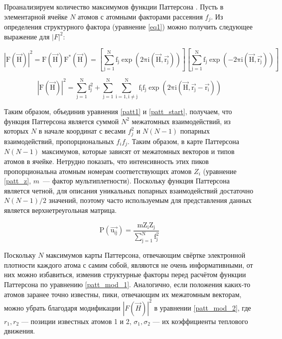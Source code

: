 Проанализируем количество максимумов функции Паттерсона \cite{rossmann_patterson_2001}. Пусть в элементарной ячейке $N$ атомов с атомными факторами рассеяния $f_j$. Из определения структурного фактора (уравнение \ref{eq1}) можно получить следующее выражение для $|F|^2$:

\begin{equation}
	\mathrm{|F(\overrightarrow{H})|^2 = F(\overrightarrow{H})F^*(\overrightarrow{H}) = \left[\sum\limits_{j=1}^N f_j \exp(2\pi i (\overrightarrow{H}, \overrightarrow{r_j}))\right]\left[\sum\limits_{j=1}^N f_j \exp(-2\pi i (\overrightarrow{H}, \overrightarrow{r_j}))\right]}
\end{equation}

\begin{equation}\label{patt1}
	\mathrm{|F(\overrightarrow{H})|^2 = \sum\limits_{j=1}^N f_j^2 + \sum\limits_{j=1}^N\sum\limits_{i=1, i\neq j}^N f_if_j\exp(2\pi i (\overrightarrow{H}, \overrightarrow{r_j}-\overrightarrow{r_i}))}
\end{equation}

Таким образом, объединив уравнения \ref{patt1} и \ref{patt_start}, получаем, что функция Паттерсона является суммой $N^2$ межатомных взаимодействий, из которых $N$ в начале координат с весами $f_j^2$ и $N(N-1)$ попарных взаимодействий, пропорциональных $f_if_j$. Таким образом, в карте Паттерсона $N(N-1)$ максимумов, которые зависят от межатомных векторов и типов атомов в ячейке. Нетрудно показать, что интенсивность этих пиков пропорциональна атомным номерам соответствующих атомов $Z_i$ (уравнение \ref{patt_z}, $m$~--- фактор мультиплетности). Поскольку функция Паттерсона является четной, для описания уникальных попарных взаимодействий достаточно $N(N-1)/2$ значений, поэтому часто используемым для представления данных является верхнетреугольная матрица. 

\begin{equation}\label{patt_z}
	\mathrm{P(\overrightarrow{u_{ij}}) = \frac{mZ_iZ_j}{\sum\limits_{j=1}^N f_j^2} }
\end{equation}

Поскольку $N$ максимумов карты Паттерсона, отвечающим свёртке электронной плотности каждого атома с самим собой, являются не очень информативными, от них можно избавиться, изменив структурные факторы перед расчётом функции Паттерсона по уравнению \ref{patt_mod_1}. Аналогично, если положения каких-то атомов заранее точно известны, пики, отвечающим их межатомным векторам, можно убрать благодаря модификации $|F(\overrightarrow{H})|^2$ в уравнении \ref{patt_mod_2}, где $r_1, r_2$ --- позиции известных атомов 1 и 2, $\sigma_1, \sigma_2$ --- их коэффициенты теплового движения.


